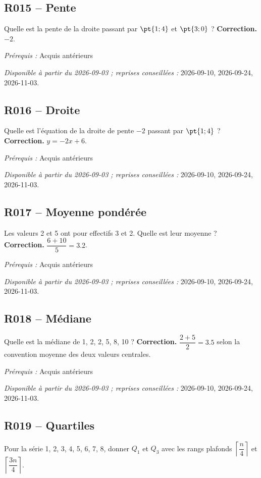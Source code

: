 \subsection*{R015 -- Pente}\label{R015}
Quelle est la pente de la droite passant par $\pt{1;4}$ et $\pt{3;0}$ ?
\ifmxteacher\textbf{Correction.} $-2$.\par\textit{Prérequis :} Acquis antérieurs\par\textit{Disponible à partir du 2026-09-03 ; reprises conseillées :} 2026-09-10, 2026-09-24, 2026-11-03.\fi
{}\subsection*{R016 -- Droite}\label{R016}
Quelle est l’équation de la droite de pente $-2$ passant par $\pt{1;4}$ ?
\ifmxteacher\textbf{Correction.} $y=-2x+6$.\par\textit{Prérequis :} Acquis antérieurs\par\textit{Disponible à partir du 2026-09-03 ; reprises conseillées :} 2026-09-10, 2026-09-24, 2026-11-03.\fi
{}\subsection*{R017 -- Moyenne pondérée}\label{R017}
Les valeurs 2 et 5 ont pour effectifs 3 et 2. Quelle est leur moyenne ?
\ifmxteacher\textbf{Correction.} $\dfrac{6+10}{5}=\num{3,2}$.\par\textit{Prérequis :} Acquis antérieurs\par\textit{Disponible à partir du 2026-09-03 ; reprises conseillées :} 2026-09-10, 2026-09-24, 2026-11-03.\fi
{}\subsection*{R018 -- Médiane}\label{R018}
Quelle est la médiane de 1, 2, 2, 5, 8, 10 ?
\ifmxteacher\textbf{Correction.} $\dfrac{2+5}{2}=\num{3,5}$ selon la convention moyenne des deux valeurs centrales.\par\textit{Prérequis :} Acquis antérieurs\par\textit{Disponible à partir du 2026-09-03 ; reprises conseillées :} 2026-09-10, 2026-09-24, 2026-11-03.\fi
{}\subsection*{R019 -- Quartiles}\label{R019}
Pour la série 1, 2, 3, 4, 5, 6, 7, 8, donner $Q_1$ et $Q_3$ avec les rangs plafonds $\left\lceil\dfrac n4\right\rceil$ et $\left\lceil\dfrac{3n}4\right\rceil$.
